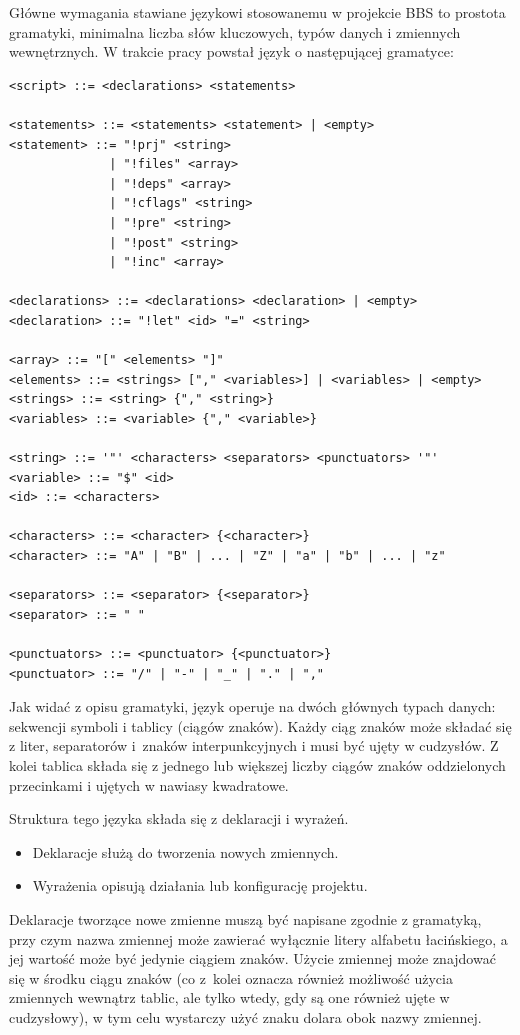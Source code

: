 Główne wymagania stawiane językowi stosowanemu w projekcie BBS to prostota gramatyki, minimalna liczba słów kluczowych, typów danych i zmiennych wewnętrznych. W trakcie pracy powstał język o następującej gramatyce:

\begin{lstlisting}[label=list:grammar,caption=Gramatyka języka projektu BBS,basicstyle=\footnotesize\ttfamily]
<script> ::= <declarations> <statements>

<statements> ::= <statements> <statement> | <empty>
<statement> ::= "!prj" <string>
              | "!files" <array>
              | "!deps" <array>
              | "!cflags" <string>
              | "!pre" <string>
              | "!post" <string>
              | "!inc" <array>

<declarations> ::= <declarations> <declaration> | <empty>
<declaration> ::= "!let" <id> "=" <string>

<array> ::= "[" <elements> "]"
<elements> ::= <strings> ["," <variables>] | <variables> | <empty>
<strings> ::= <string> {"," <string>}
<variables> ::= <variable> {"," <variable>}

<string> ::= '"' <characters> <separators> <punctuators> '"'
<variable> ::= "$" <id>
<id> ::= <characters>

<characters> ::= <character> {<character>}
<character> ::= "A" | "B" | ... | "Z" | "a" | "b" | ... | "z"

<separators> ::= <separator> {<separator>}
<separator> ::= " "

<punctuators> ::= <punctuator> {<punctuator>}
<punctuator> ::= "/" | "-" | "_" | "." | ","
\end{lstlisting}

Jak widać z opisu gramatyki, język operuje na dwóch głównych typach danych: sekwencji symboli i tablicy (ciągów znaków). Każdy ciąg znaków może składać się z liter, separatorów i~znaków interpunkcyjnych i musi być ujęty w cudzysłów. Z kolei tablica składa się z jednego lub większej liczby ciągów znaków oddzielonych przecinkami i ujętych w nawiasy kwadratowe.

Struktura tego języka składa się z deklaracji i wyrażeń.
\begin{itemize}
    \item Deklaracje służą do tworzenia nowych zmiennych.
    \item Wyrażenia opisują działania lub konfigurację projektu.
\end{itemize}

Deklaracje tworzące nowe zmienne muszą być napisane zgodnie z gramatyką, przy czym nazwa zmiennej może zawierać wyłącznie litery alfabetu łacińskiego, a jej wartość może być jedynie ciągiem znaków. Użycie zmiennej może znajdować się w środku ciągu znaków (co z~kolei oznacza również możliwość użycia zmiennych wewnątrz tablic, ale tylko wtedy, gdy są one również ujęte w cudzysłowy), w tym celu wystarczy użyć znaku dolara obok nazwy zmiennej.

